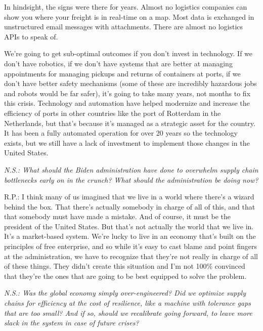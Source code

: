 \documentclass[
]{book}
\begin{document}
In hindsight, the signs were there for years. Almost no logistics companies can show you where your freight is in real-time on a map. Most data is exchanged in unstructured email messages with attachments. There are almost no logistics APIs to speak of.

We're going to get sub-optimal outcomes if you don't invest in technology. If we don't have robotics, if we don't have systems that are better at managing appointments for managing pickups and returns of containers at ports, if we don't have better safety mechanisms (some of these are incredibly hazardous jobs and robots would be far safer), it's going to take many years, not months to fix this crisis. Technology and automation have helped modernize and increase the efficiency of ports in other countries like the port of Rotterdam in the Netherlands, but that's because it's managed as a strategic asset for the country. It has been a fully automated operation for over 20 years so the technology exists, but we still have a lack of investment to implement those changes in the United States.

\emph{N.S.: What should the Biden administration have done to overwhelm supply chain bottlenecks early on in the crunch? What should the administration be doing now?}

R.P.: I think many of us imagined that we live in a world where there's a wizard behind the box. That there's actually somebody in charge of all of this, and that that somebody must have made a mistake. And of course, it must be the president of the United States. But that's not actually the world that we live in. It's a market-based system. We're lucky to live in an economy that's built on the principles of free enterprise, and so while it's easy to cast blame and point fingers at the administration, we have to recognize that they're not really in charge of all of these things. They didn't create this situation and I'm not 100\% convinced that they're the ones that are going to be best equipped to solve the problem.

\emph{N.S.: Was the global economy simply over-engineered? Did we optimize supply chains for efficiency at the cost of resilience, like a machine with tolerance gaps that are too small? And if so, should we recalibrate going forward, to leave more slack in the system in case of future crises?}
\end{document}
